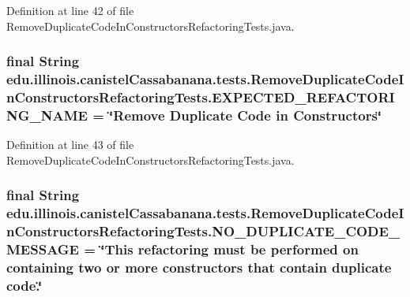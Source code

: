 Definition at line 42 of file RemoveDuplicateCodeInConstructorsRefactoringTests.java.

\hypertarget{classedu_1_1illinois_1_1canistelCassabanana_1_1tests_1_1RemoveDuplicateCodeInConstructorsRefactoringTests_a6731732fcf429dca7528f1b1e9327d96}{
\subsubsection[{EXPECTED\_\-REFACTORING\_\-NAME}]{\setlength{\rightskip}{0pt plus 5cm}final String {\bf edu.illinois.canistelCassabanana.tests.RemoveDuplicateCodeInConstructorsRefactoringTests.EXPECTED\_\-REFACTORING\_\-NAME} = \char`\"{}Remove Duplicate Code in Constructors\char`\"{}}}
\label{classedu_1_1illinois_1_1canistelCassabanana_1_1tests_1_1RemoveDuplicateCodeInConstructorsRefactoringTests_a6731732fcf429dca7528f1b1e9327d96}


Definition at line 43 of file RemoveDuplicateCodeInConstructorsRefactoringTests.java.

\hypertarget{classedu_1_1illinois_1_1canistelCassabanana_1_1tests_1_1RemoveDuplicateCodeInConstructorsRefactoringTests_afbc679d5c59bbc0ffc5582ce412a2492}{
\subsubsection[{NO\_\-DUPLICATE\_\-CODE\_\-MESSAGE}]{\setlength{\rightskip}{0pt plus 5cm}final String {\bf edu.illinois.canistelCassabanana.tests.RemoveDuplicateCodeInConstructorsRefactoringTests.NO\_\-DUPLICATE\_\-CODE\_\-MESSAGE} = \char`\"{}This refactoring must be performed on containing two or more constructors that contain duplicate code.\char`\"{}}}
\label{classedu_1_1illinois_1_1canistelCassabanana_1_1tests_1_1RemoveDuplicateCodeInConstructorsRefactoringTests_afbc679d5c59bbc0ffc5582ce412a2492}


